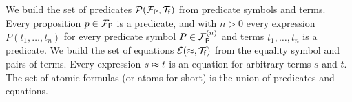
\begin{definition}\label{def:predicates}
	We build the set of {\myem predicates} ${{\mathcal P}({{\mathcal F}_{\mathsf P}},{\mathcal T}_{\mathsf f}})$
	from predicate symbols and terms. 
	Every proposition $p\in {{\mathcal F}_{\mathsf P}}$ is a predicate, 
	and with $n>0$ 
	every expression $P(t_1,\ldots,t_n)$
	for every predicate symbol $P\in{{\mathcal F}_{\mathsf P}^{(n)}}$ and terms $t_1,\ldots,t_n$ is a predicate.
%	
	We build the set of {\myem equations }${{\mathcal E}(\approx, {\mathcal T}_{\mathsf f}})$ from the equality symbol and pairs of terms.
	Every expression $s\approx t$ is an equation for arbitrary terms $s$ and $t$.
%	
	The set of atomic formulas (or {\myem atoms }for short) is the union of predicates and equations.
\end{definition}